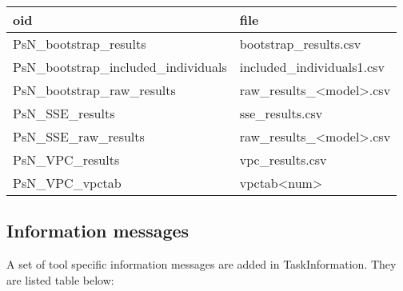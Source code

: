 \begin{tabular}{ l l}
      oid & file \\
    \hline
      PsN\_bootstrap\_results & bootstrap\_results.csv \\
      PsN\_bootstrap\_included\_individuals & included\_individuals1.csv \\
      PsN\_bootstrap\_raw\_results & raw\_results\_<model>.csv \\
      PsN\_SSE\_results & sse\_results.csv \\
      PsN\_SSE\_raw\_results & raw\_results\_<model>.csv \\
      PsN\_VPC\_results & vpc\_results.csv \\
      PsN\_VPC\_vpctab & vpctab<num> \\
\end{tabular}



\subsection{Information messages}
A set of tool specific information messages are added in TaskInformation. They are listed table below:


